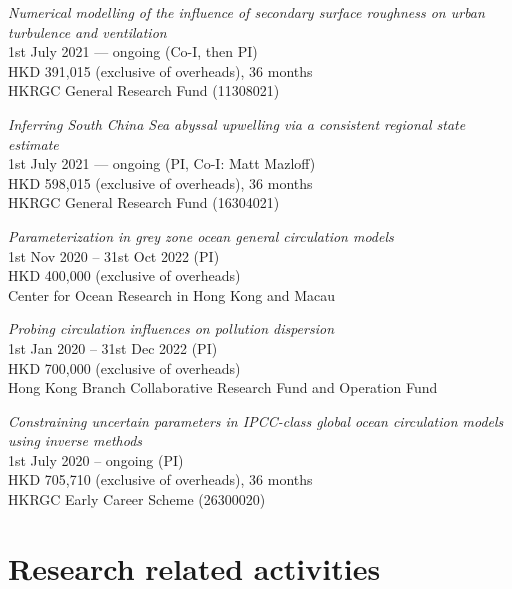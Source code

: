 \documentclass[letterpaper]{article}
\renewenvironment{itemize}{
  \begin{list}{}{
    \setlength{\leftmargin}{1.5em}
  }
}{
  \end{list}
}
\begin{document}
\begin{itemize}

\item[--] \textit{Numerical modelling of the influence of secondary surface roughness on urban turbulence and ventilation}\\
1st July 2021 --- ongoing (Co-I, then PI)\\
HKD 391,015 (exclusive of overheads), 36 months\\
HKRGC General Research Fund (11308021)

\item[--] \textit{Inferring South China Sea abyssal upwelling via a consistent regional state estimate}\\
1st July 2021 --- ongoing (PI, Co-I: Matt Mazloff)\\
HKD 598,015 (exclusive of overheads), 36 months\\
HKRGC General Research Fund (16304021)

\item[--] \textit{Parameterization in grey zone ocean general circulation models}\\
1st Nov 2020 -- 31st Oct 2022 (PI)\\
HKD 400,000 (exclusive of overheads)\\
Center for Ocean Research in Hong Kong and Macau

\item[--] \textit{Probing circulation influences on pollution dispersion}\\
1st Jan 2020 -- 31st Dec 2022 (PI)\\
HKD 700,000 (exclusive of overheads)\\ 
Hong Kong Branch Collaborative Research Fund and Operation Fund

\item[--] \textit{Constraining uncertain parameters in IPCC-class global ocean
circulation models using inverse methods}\\
1st July 2020 -- ongoing (PI)\\
HKD 705,710 (exclusive of overheads), 36 months \\
HKRGC Early Career Scheme (26300020)

\end{itemize}

\section*{Research related activities}
\end{document}

